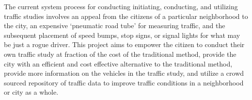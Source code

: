 The current system process for conducting initiating, conducting, and utilizing traffic studies involves an appeal from the citizens of a particular neighborhood to the city, an expensive ‘pneumatic road tube’ for measuring traffic, and the subsequent placement of speed bumps, stop signs, or signal lights for what may be just a rogue driver. This project aims to empower the citizen to conduct their own traffic study at fraction of the cost of the traditional method, provide the city with an efficient and cost effective alternative to the traditional method, provide more information on the vehicles in the traffic study, and utilize a crowd sourced repository of traffic data to improve traffic conditions in a neighborhood or city as a whole.